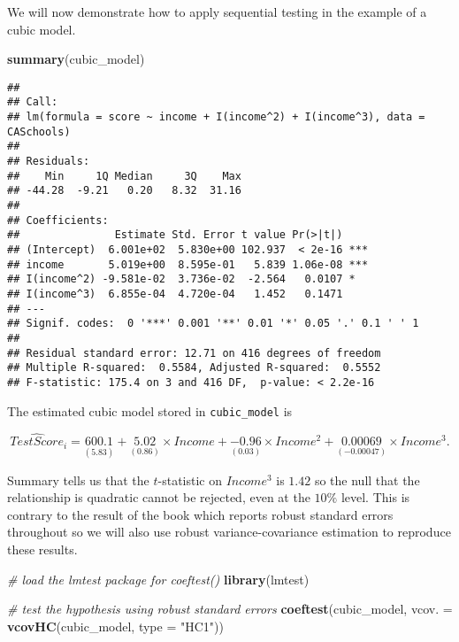 \documentclass[]{book}
\newenvironment{Shaded}{\begin{snugshade}}{\end{snugshade}}
\newcommand{\KeywordTok}[1]{\textcolor[rgb]{0.13,0.29,0.53}{\textbf{#1}}}
\newcommand{\DataTypeTok}[1]{\textcolor[rgb]{0.13,0.29,0.53}{#1}}
\newcommand{\StringTok}[1]{\textcolor[rgb]{0.31,0.60,0.02}{#1}}
\newcommand{\CommentTok}[1]{\textcolor[rgb]{0.56,0.35,0.01}{\textit{#1}}}
\newcommand{\NormalTok}[1]{#1}
\theoremstyle{definition}
\theoremstyle{definition}
\theoremstyle{definition}
\theoremstyle{remark}
\begin{document}
We will now demonstrate how to apply sequential testing in the example
of a cubic model.

\begin{Shaded}
\begin{Highlighting}[]
\KeywordTok{summary}\NormalTok{(cubic_model)}
\end{Highlighting}
\end{Shaded}

\begin{verbatim}
## 
## Call:
## lm(formula = score ~ income + I(income^2) + I(income^3), data = CASchools)
## 
## Residuals:
##    Min     1Q Median     3Q    Max 
## -44.28  -9.21   0.20   8.32  31.16 
## 
## Coefficients:
##               Estimate Std. Error t value Pr(>|t|)    
## (Intercept)  6.001e+02  5.830e+00 102.937  < 2e-16 ***
## income       5.019e+00  8.595e-01   5.839 1.06e-08 ***
## I(income^2) -9.581e-02  3.736e-02  -2.564   0.0107 *  
## I(income^3)  6.855e-04  4.720e-04   1.452   0.1471    
## ---
## Signif. codes:  0 '***' 0.001 '**' 0.01 '*' 0.05 '.' 0.1 ' ' 1
## 
## Residual standard error: 12.71 on 416 degrees of freedom
## Multiple R-squared:  0.5584, Adjusted R-squared:  0.5552 
## F-statistic: 175.4 on 3 and 416 DF,  p-value: < 2.2e-16
\end{verbatim}

The estimated cubic model stored in \texttt{cubic\_model} is

\[ \widehat{TestScore}_i = \underset{(5.83)}{600.1} + \underset{(0.86)}{5.02} \times Income + \underset{(0.03)}{-0.96} \times Income^2 + \underset{(-0.00047)}{0.00069}  \times Income^3. \]

Summary tells us that the \(t\)-statistic on \(Income^3\) is \(1.42\) so
the null that the relationship is quadratic cannot be rejected, even at
the \(10\%\) level. This is contrary to the result of the book which
reports robust standard errors throughout so we will also use robust
variance-covariance estimation to reproduce these results.

\begin{Shaded}
\begin{Highlighting}[]
\CommentTok{# load the lmtest package for coeftest()}
\KeywordTok{library}\NormalTok{(lmtest)}

\CommentTok{# test the hypothesis using robust standard errors}
\KeywordTok{coeftest}\NormalTok{(cubic_model, }\DataTypeTok{vcov. =} \KeywordTok{vcovHC}\NormalTok{(cubic_model, }\DataTypeTok{type =} \StringTok{"HC1"}\NormalTok{))}
\end{Highlighting}
\end{Shaded}
\end{document}
